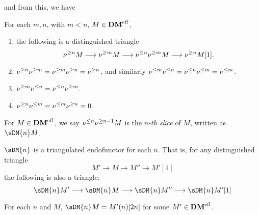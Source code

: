 and from this, we have

\begin{prop}
For each $m, n$, with $m < n$, $M \in \mathbf{DM}^{\mathrm{eff}}$,

\begin{enumerate}
\item the following is a distinguished triangle
\begin{equation}
\nu^{\geq n}M \longrightarrow \nu^{\geq m}M \longrightarrow \nu^{\leq n}\nu^{\geq m}M \longrightarrow \nu^{\geq n}M[1].
\end{equation}

\item $\nu^{\geq n}\nu^{\geq m} = \nu^{\geq m}\nu^{\geq n} = \nu^{\geq n}$, and 
similarly $\nu^{\leq m}\nu^{\leq n} = \nu^{\leq n}\nu^{\leq m} = \nu^{\leq m}$.

\item $\nu^{\geq m}\nu^{\leq n} = \nu^{\leq n}\nu^{\geq m}$.

\item $\nu^{\geq n}\nu^{\leq m} = \nu^{\leq m}\nu^{\geq n} = 0$.
\end{enumerate}
\end{prop}

\begin{definition}
For $M \in \mathbf{DM}^{\mathrm{eff}}$, we say $\nu^{\leq n}\nu^{\geq n - 1}M$ is the 
\emph{$n$-th slice} of $M$, written as $\sDM{n}M$.
\end{definition}

\begin{prop}
$\sDM{n}$ is a triangulated endofunctor for each $n$. That is,
for any distinguished triangle
\[
M' \to M \to M'' \to M'[1]
\]
the following is also a triangle:
\[
\sDM{n}M' \to \sDM{n}M \to \sDM{n}M'' \to \sDM{n}M'[1]
\]
\end{prop}

\begin{prop}\label{DMeff_slice_fund_invariant}
For each $n$ and $M$, $\sDM{n}M = M'(n)[2n]$ for some $M' \in
\mathbf{DM}^{\mathrm{eff}}$.
\end{prop}


